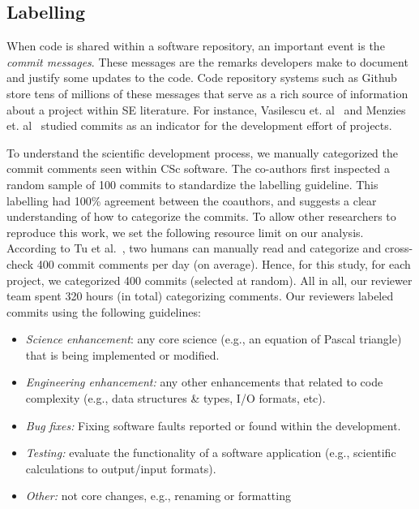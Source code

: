 \documentclass[conference,10pt]{IEEEtran}
\newcommand{\bi}{\begin{itemize}}
\newcommand{\ei}{\end{itemize}}
\begin{document}
 \subsection{Labelling}\label{tion:labelling}
 When code is shared
within a software repository, an important event is the {\em commit messages}. These messages are the remarks developers make to document and justify some updates to the code. Code repository systems such as Github store tens of millions of these messages that serve as a rich source of information about a project within SE literature. For instance, Vasilescu et. al~\cite{vasilescu16_limit} and Menzies et. al~\cite{xia2019sequential} studied commits as an indicator for the development effort of projects.


To understand the scientific development process, we manually categorized the commit comments seen within CSc
software.  The co-authors first inspected a random sample of 100 commits to standardize the labelling guideline. This labelling had
100\% agreement between the coauthors, and suggests a clear understanding of how to categorize the commits. 
To allow other researchers to reproduce this work, we set
the following
resource limit on our analysis.
According to Tu et al.~\cite{tu2019better}, two humans can manually read and categorize
and cross-check 400 commit comments per day (on average).
Hence, for this study, for each project, we categorized 400 commits
(selected at random). 
All in all, our
reviewer team spent 320 hours (in total) categorizing comments. Our  reviewers
labeled commits using the following
guidelines:



\bi
\item {\em Science enhancement}: any core science (e.g., an equation of Pascal triangle) that is being implemented or modified.
\item {\em Engineering enhancement:} any other enhancements that related to code complexity (e.g., data structures \& types, I/O formats, etc).
\item {\em Bug fixes:} Fixing software faults reported or found within the development. 
\item {\em Testing: } evaluate the functionality of a software application (e.g., scientific calculations to output/input formats).
\item
{\em Other:} not core changes, e.g., renaming or formatting 
\ei
\end{document}
